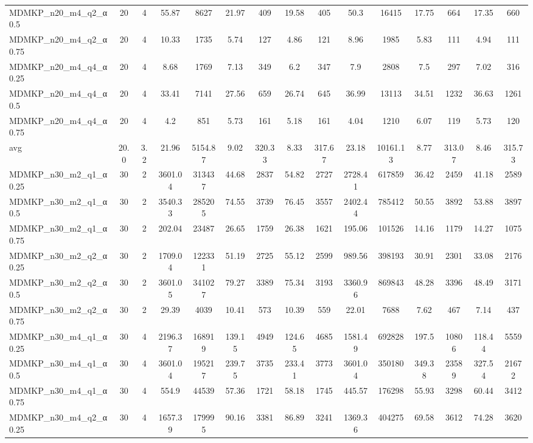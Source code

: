 \begin{table}[!ht]
{\begin{tabular}{lcccccccccccccc}
MDMKP\_n20\_m4\_q2\_α0.5 & 20 & 4 & 55.87 & 8627 & 21.97 & 409 & 19.58 & 405 & 50.3 & 16415 & 17.75 & 664 & 17.35 & 660 \\
MDMKP\_n20\_m4\_q2\_α0.75 & 20 & 4 & 10.33 & 1735 & 5.74 & 127 & 4.86 & 121 & 8.96 & 1985 & 5.83 & 111 & 4.94 & 111 \\
MDMKP\_n20\_m4\_q4\_α0.25 & 20 & 4 & 8.68 & 1769 & 7.13 & 349 & 6.2 & 347 & 7.9 & 2808 & 7.5 & 297 & 7.02 & 316 \\
MDMKP\_n20\_m4\_q4\_α0.5 & 20 & 4 & 33.41 & 7141 & 27.56 & 659 & 26.74 & 645 & 36.99 & 13113 & 34.51 & 1232 & 36.63 & 1261 \\
MDMKP\_n20\_m4\_q4\_α0.75 & 20 & 4 & 4.2 & 851 & 5.73 & 161 & 5.18 & 161 & 4.04 & 1210 & 6.07 & 119 & 5.73 & 120 \\
\hline avg & 20.0 & 3.2 & 21.96& 5154.87 & 9.02& 320.33 & 8.33& 317.67 & 23.18& 10161.13 & 8.77& 313.07 & 8.46& 315.73\\ \hline
MDMKP\_n30\_m2\_q1\_α0.25 & 30 & 2 & 3601.04 & 313437 & 44.68 & 2837 & 54.82 & 2727 & 2728.41 & 617859 & 36.42 & 2459 & 41.18 & 2589 \\
MDMKP\_n30\_m2\_q1\_α0.5 & 30 & 2 & 3540.33 & 285205 & 74.55 & 3739 & 76.45 & 3557 & 2402.44 & 785412 & 50.55 & 3892 & 53.88 & 3897 \\
MDMKP\_n30\_m2\_q1\_α0.75 & 30 & 2 & 202.04 & 23487 & 26.65 & 1759 & 26.38 & 1621 & 195.06 & 101526 & 14.16 & 1179 & 14.27 & 1075 \\
MDMKP\_n30\_m2\_q2\_α0.25 & 30 & 2 & 1709.04 & 122331 & 51.19 & 2725 & 55.12 & 2599 & 989.56 & 398193 & 30.91 & 2301 & 33.08 & 2176 \\
MDMKP\_n30\_m2\_q2\_α0.5 & 30 & 2 & 3601.05 & 341027 & 79.27 & 3389 & 75.34 & 3193 & 3360.96 & 869843 & 48.28 & 3396 & 48.49 & 3171 \\
MDMKP\_n30\_m2\_q2\_α0.75 & 30 & 2 & 29.39 & 4039 & 10.41 & 573 & 10.39 & 559 & 22.01 & 7688 & 7.62 & 467 & 7.14 & 437 \\
MDMKP\_n30\_m4\_q1\_α0.25 & 30 & 4 & 2196.37 & 168919 & 139.15 & 4949 & 124.65 & 4685 & 1581.49 & 692828 & 197.5 & 10806 & 118.44 & 5559 \\
MDMKP\_n30\_m4\_q1\_α0.5 & 30 & 4 & 3601.04 & 195217 & 239.75 & 3735 & 233.41 & 3773 & 3601.04 & 350180 & 349.38 & 23589 & 327.54 & 21672 \\
MDMKP\_n30\_m4\_q1\_α0.75 & 30 & 4 & 554.9 & 44539 & 57.36 & 1721 & 58.18 & 1745 & 445.57 & 176298 & 55.93 & 3298 & 60.44 & 3412 \\
MDMKP\_n30\_m4\_q2\_α0.25 & 30 & 4 & 1657.39 & 179995 & 90.16 & 3381 & 86.89 & 3241 & 1369.36 & 404275 & 69.58 & 3612 & 74.28 & 3620 \\

\end{tabular}}
\end{table}
